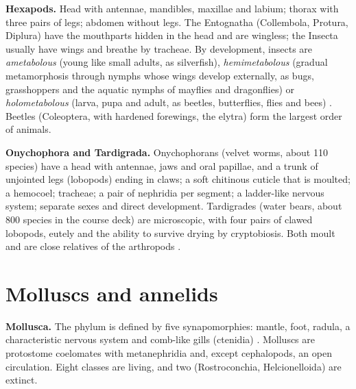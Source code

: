 \textbf{Hexapods.} Head with antennae,
mandibles, maxillae and labium; thorax with
three pairs of legs; abdomen without legs.
The Entognatha (Collembola, Protura, Diplura)
have the mouthparts hidden in the head and
are wingless; the Insecta usually have wings
and breathe by tracheae. By development,
insects are \emph{ametabolous} (young like
small adults, as silverfish),
\emph{hemimetabolous} (gradual metamorphosis
through nymphs whose wings develop
externally, as bugs, grasshoppers and the
aquatic nymphs of mayflies and dragonflies)
or \emph{holometabolous} (larva, pupa and
adult, as beetles, butterflies, flies and
bees) \cite[Chapter 12]{hickman2002animal}.
Beetles (Coleoptera, with hardened forewings,
the elytra) form the largest order of
animals.

\textbf{Onychophora and Tardigrada.}
Onychophorans (velvet worms, about 110
species) have a head with antennae, jaws and
oral papillae, and a trunk of unjointed legs
(lobopods) ending in claws; a soft chitinous
cuticle that is moulted; a hemocoel;
tracheae; a pair of nephridia per segment; a
ladder-like nervous system; separate sexes
and direct development. Tardigrades (water
bears, about 800 species in the course deck)
are microscopic, with four pairs of clawed
lobopods, eutely and the ability to survive
drying by cryptobiosis. Both moult and are
close relatives of the arthropods
\cite[Chapter 13]{hickman2002animal}.

\section{Molluscs and annelids}
\label{section-molluscs-annelids}

\textbf{Mollusca.} The phylum is defined by
five synapomorphies: mantle, foot, radula, a
characteristic nervous system and comb-like
gills (ctenidia) \cite{castillo2014moluscos}.
Molluscs are protostome coelomates with
metanephridia and, except cephalopods, an
open circulation. Eight classes are living,
and two (Rostroconchia, Helcionelloida) are
extinct.

